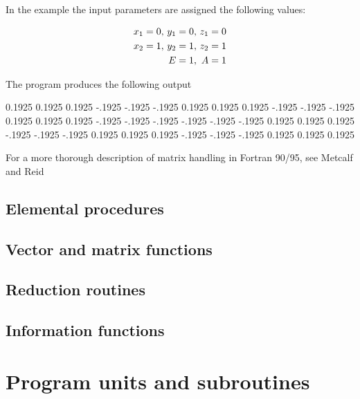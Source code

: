 In the example the input parameters are assigned the following values:

\begin{eqnarray}
x_{1} =0,\,y_{1} =0,\,z_{1} =0 \\
x_{2} =1,\,y_{2} =1,\,z_{2} =1 \\
E\/=\/1,\,\,A=1
\end{eqnarray}


The program produces the following output

\cmdmode

\begin{fortrancodeenv}
0.1925    0.1925    0.1925    -.1925    -.1925    -.1925
0.1925    0.1925    0.1925    -.1925    -.1925    -.1925
0.1925    0.1925    0.1925    -.1925    -.1925    -.1925
-.1925    -.1925    -.1925    0.1925    0.1925    0.1925
-.1925    -.1925    -.1925    0.1925    0.1925    0.1925
-.1925    -.1925    -.1925    0.1925    0.1925    0.1925
\end{fortrancodeenv}

\fmode

For a more thorough description of matrix handling in Fortran 90/95, see Metcalf and Reid \cite{metcalf00}

\subsection{Elemental procedures}
\subsection{Vector and matrix functions}
\subsection{Reduction routines}
\subsection{Information functions}

\section{Program units and subroutines}

